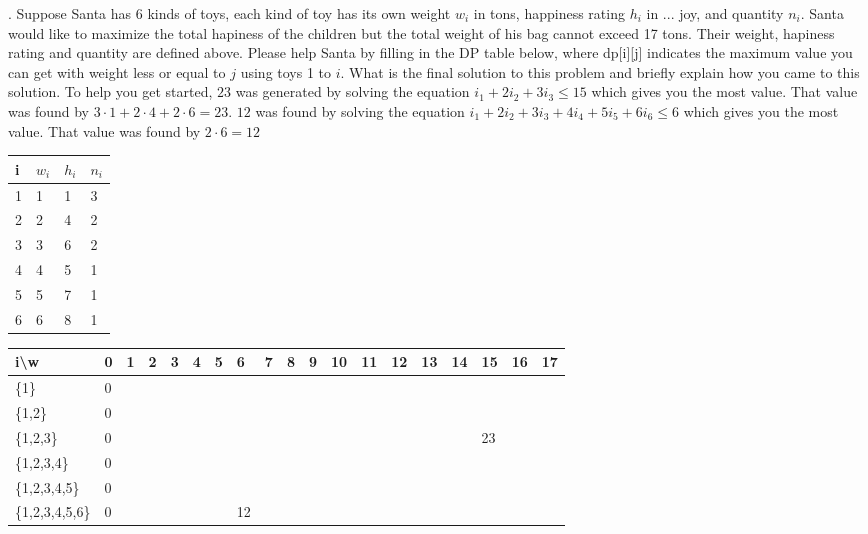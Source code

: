 \documentclass[12pt]{article}
\begin{document}
. Suppose Santa has 6 kinds of toys, each kind of toy has its own weight $w_i$ in tons, happiness rating $h_i$ in ... joy, and quantity $n_i$. Santa would like to maximize the total hapiness of the children but the total weight of his bag cannot exceed 17 tons. Their weight, hapiness rating and quantity are defined above. Please help Santa by filling in the DP table below, where dp[i][j] indicates the maximum value you can get with weight less or equal to $j$ using toys 1 to $i$. What is the final solution to this problem and briefly explain how you came to this solution. To help you get started, $23$ was generated by solving the equation $i_1+2i_2+3i_3 \leq 15$ which gives you the most value. That value was found by $3\cdot 1+ 2 \cdot 4 + 2 \cdot 6 = 23$. $12$ was found by solving the equation $i_1+2i_2+3i_3+4i_4+5i_5+6i_6 \leq 6$ which gives you the most value. That value was found by $2\cdot 6 = 12$ 
\begin{table}[]
\begin{tabular}{|l|l|l|l|}
\hline
i & $w_i$ & $h_i$ & $n_i$ \\ \hline
1 & 1    & 1    & 3    \\ \hline
2 & 2    & 4    & 2    \\ \hline
3 & 3    & 6    & 2    \\ \hline
4 & 4    & 5    & 1    \\ \hline
5 & 5    & 7    & 1    \\ \hline
6 & 6    & 8    & 1    \\ \hline
\end{tabular}
\end{table}
\FloatBarrier
\begin{table}[]
    \begin{tabular}{|l|l|l|l|l|l|l|l|l|l|l|l|l|l|l|l|l|l|l|}
    \hline
    i\textbackslash{}w & 0 & 1 & 2 & 3 & 4 & 5 & 6  & 7 & 8 & 9 & 10 & 11 & 12 & 13 & 14 & 15 & 16 & 17 \\ \hline
    \{1\}                  & 0 &   &   &   &   &   &    &   &   &   &    &    &    &    &    &    &    &    \\ \hline
    \{1,2\}                  & 0 &   &   &   &   &   &    &   &   &   &    &    &    &    &    &    &    &    \\ \hline
    \{1,2,3\}                  & 0 &   &   &   &   &   &    &   &   &   &    &    &    &    &    & 23 &    &    \\ \hline
    \{1,2,3,4\}                  & 0 &   &   &   &   &   &    &   &   &   &    &    &    &    &    &    &    &    \\ \hline
    \{1,2,3,4,5\}                  & 0 &   &   &   &   &   &    &   &   &   &    &    &    &    &    &    &    &    \\ \hline
    \{1,2,3,4,5,6\}                  & 0 &   &   &   &   &   & 12 &   &   &   &    &    &    &    &    &    &    &    \\ \hline
    \end{tabular}
    \end{table}
\end{document}
